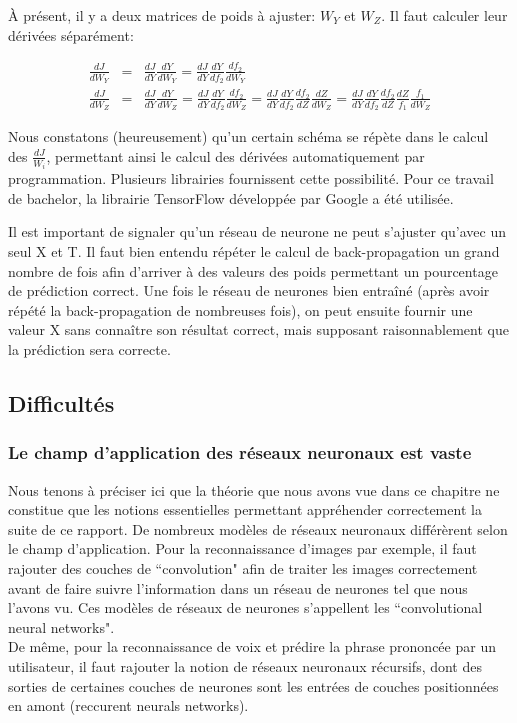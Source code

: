 \documentclass[11pt,a4paper]{report}
\begin{document}
    \par À présent, il y a deux matrices de poids à ajuster: $W_Y$ et $W_Z$. Il faut calculer leur dérivées séparément: 
    
    \begin{eqnarray}
    \frac{dJ}{dW_Y} &=& \frac{dJ}{dY} \frac{dY}{dW_Y} = \frac{dJ}{dY} \frac{dY}{df_2}\frac{df_2}{dW_Y} \\
    \frac{dJ}{dW_Z} &=& \frac{dJ}{dY} \frac{dY}{dW_Z} = \frac{dJ}{dY} \frac{dY}{df_2}\frac{df_2}{dW_Z} = \frac{dJ}{dY} \frac{dY}{df_2}\frac{df_2}{dZ}\frac{dZ}{dW_Z} = \frac{dJ}{dY} \frac{dY}{df_2}\frac{df_2}{dZ} \frac{dZ}{f_1}\frac{f_1}{dW_Z} 
    \end{eqnarray}

    \par Nous constatons (heureusement) qu'un certain schéma se répète dans le calcul des $\frac{dJ}{W_i}$, permettant ainsi le calcul des dérivées automatiquement par programmation. Plusieurs librairies fournissent cette possibilité. Pour ce travail de bachelor, la librairie TensorFlow développée par Google a été utilisée. 
    
    \par Il est important de signaler qu'un réseau de neurone ne peut s'ajuster qu'avec un seul X et T. Il faut bien entendu répéter le calcul de back-propagation un grand nombre de fois afin d'arriver à des valeurs des poids permettant un pourcentage de prédiction correct. Une fois le réseau de neurones bien entraîné (après avoir répété la back-propagation de nombreuses fois), on peut ensuite fournir une valeur X sans connaître son résultat correct, mais supposant raisonnablement que la prédiction sera correcte. 
    
  \subsection{Difficultés}
  
  \subsubsection{Le champ d'application des réseaux neuronaux est vaste}
  
    \par Nous tenons à préciser ici que la théorie que nous avons vue dans ce chapitre ne constitue que les notions essentielles permettant appréhender correctement la suite de ce rapport. De nombreux modèles de réseaux neuronaux différèrent selon le champ d'application. Pour la reconnaissance d'images par exemple, il faut rajouter des couches de ``convolution" afin de traiter les images correctement avant de faire suivre l'information dans un réseau de neurones tel que nous l'avons vu. Ces modèles de réseaux de neurones s'appellent les ``convolutional neural networks". \\
    De même, pour la reconnaissance de voix et prédire la phrase prononcée par un utilisateur, il faut rajouter la notion de réseaux neuronaux récursifs, dont des sorties de certaines couches de neurones sont les entrées de couches positionnées en amont (reccurent neurals networks). 
  
\end{document}
